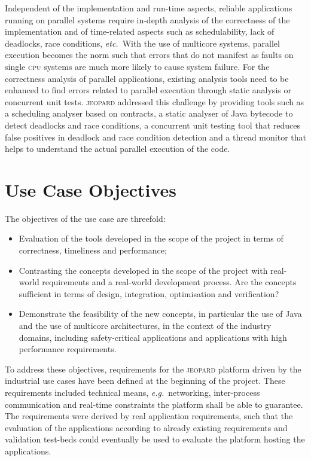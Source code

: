 \documentclass{sig-alternate}
\newcommand{\acronym}[1]{\textsc{#1}}
\newcommand{\eg}{\textit{e.g.}}
\newcommand{\etc}{\textit{etc.}}
\begin{document}
\begin{itemize}
Independent of the implementation and run-time aspects,
reliable applications running on parallel systems require in-depth
analysis of the correctness of the implementation and
of time-related aspects such as schedulability, lack of deadlocks,
race conditions, \etc\ With the use of multicore systems,
parallel execution becomes the norm such that errors
that do not manifest as faults on single \acronym{cpu} systems are
much more likely to cause system failure.
For the correctness analysis of parallel applications, existing
analysis tools need to be enhanced to find errors related
to parallel execution through static analysis or concurrent
unit tests. \acronym{jeopard} addressed this challenge
by providing tools such as 
a scheduling analyser based on contracts,
a static analyser of Java bytecode 
to detect deadlocks and race conditions,
a concurrent unit testing tool \cite{szed:09}
that reduces false positives
in deadlock and race condition detection and
a thread monitor that helps 
to understand the actual parallel execution of the code.
\end{itemize}

\section{Use Case Objectives}\label{sec:obj}
The objectives of the use case are threefold:
\begin{itemize}
\item Evaluation of the tools developed in the scope of the project
      in terms of correctness, timeliness and performance;
\item Contrasting the concepts developed in the scope of the project
      with real-world requirements and a real-world development process.
      Are the concepts sufficient in terms of 
      design, integration, optimisation and verification?
\item Demonstrate the feasibility of the new concepts,
      in particular the use of Java and the use of multicore architectures,
      in the context of the industry domains,
      including safety-critical applications
      and applications with high performance requirements. 
\end{itemize}

To address these objectives, requirements 
for the \acronym{jeopard} platform 
driven by the industrial use cases
have been defined at the beginning of the project.
These requirements included technical means, 
\eg\ networking, inter-process communication 
and real-time constraints the platform shall be able to guarantee.
The requirements were derived by real application requirements,
such that the evaluation of the applications
according to already existing requirements and validation test-beds
could eventually be used to evaluate the platform hosting the applications.
\end{document}
